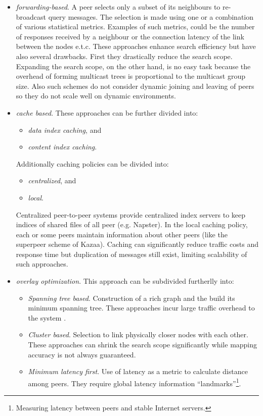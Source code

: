 \documentclass[a4paper,10pt]{article}
\begin{document}
\begin{itemize}
  \item \emph{forwarding-based}. A peer selects only a subset of its neighbours to re-broadcast query messages. The selection is made using one or a combination of various statistical metrics. Examples of such metrics, could be the number of responses received by a neighbour or the connection latency of the link between the nodes e.t.c. These approaches enhance search efficiency but have also several drawbacks. First they drastically reduce the search scope. Expanding the search scope, on the other hand, is no easy task because the overhead of forming multicast trees is proportional to the multicast group size. Also such schemes do not consider dynamic joining and leaving of peers so they do not scale well on dynamic environments.
  \item \emph{cache based}. These approaches can be further divided into:
  \begin{itemize}
    \item \emph{data index caching}, and
    \item \emph{content index caching}.
  \end{itemize}
  Additionally caching policies can be divided into:
  \begin{itemize}
    \item \emph{centralized}, and
    \item \emph{local}.
  \end{itemize}
  Centralized peer-to-peer systems provide centralized index servers to keep indices of shared files of all peer (e.g. Napster). In the local caching policy, each or some peers maintain information about other peers (like the superpeer scheme of Kazaa). Caching can significantly reduce traffic costs and response time but duplication of messages still exist, limiting scalability of such approaches.
  \item \emph{overlay optimization}. This approach can be subdivided furtherlly into:
  \begin{itemize}
    \item \emph{Spanning tree based}. Construction of a rich graph and the build its minimum spanning tree. These approaches incur large traffic overhead to the system \cite{chu_esm_2000, chu_esm_2002}.
    \item \emph{Cluster based}. Selection to link physically closer nodes with each other. These approaches can shrink the search scope significantly while mapping accuracy is not always guaranteed.
    \item \emph{Minimum latency first}. Use of latency as a metric to calculate distance among peers. They require global latency information ``landmarks''\footnote{Measuring latency between peers and stable Internet servers.}.
  \end{itemize}
\end{itemize}
\end{document}

